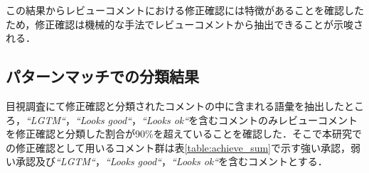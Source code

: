 \documentclass[11pt]{jreport}
\newcommand{\todo}[1]{\colorbox{yellow}{{\bf TODO}:}{\color{red} {\textbf{[#1]}}}}
\begin{document}
この結果からレビューコメントにおける修正確認には特徴があることを確認したため，修正確認は機械的な手法でレビューコメントから抽出できることが示唆される．




\begin{table}[t]
\centering
  \caption{修正確認に含まれていた内容}
  \label{table:achieve_sum}
\end{table}

\subsection{パターンマッチでの分類結果}
目視調査にて修正確認と分類されたコメントの中に含まれる語彙を抽出したところ，\textit{``LGTM``}，\textit{``Looks good``}，\textit{``Looks ok``}を含むコメントのみレビューコメントを修正確認と分類した割合が90\%を超えていることを確認した．そこで本研究での修正確認として用いるコメント群は表\ref{table:achieve_sum}で示す強い承認，弱い承認及び\textit{``LGTM``}，\textit{``Looks good``}，\textit{``Looks ok``}を含むコメントとする．
\end{document}
